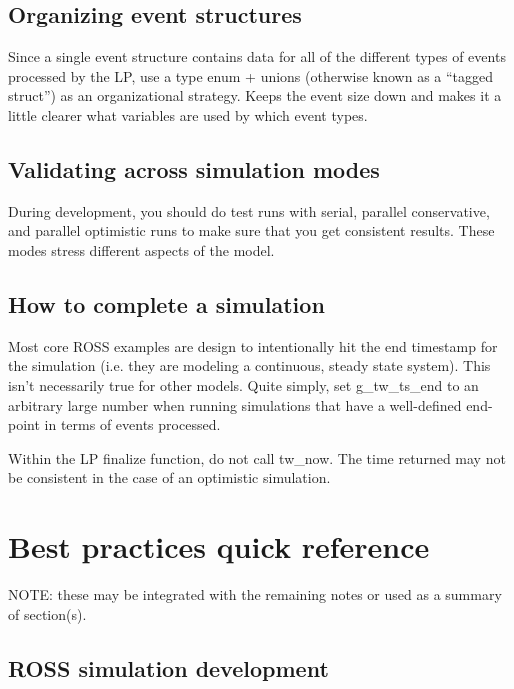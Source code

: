 \documentclass[conference,10pt,compsocconf,onecolumn]{IEEEtran}
\begin{document}
\subsection{Organizing event structures}

Since a single event structure contains data for all of the different types of
events processed by the LP, use a type enum + unions (otherwise known as a
``tagged struct'') as an organizational strategy. Keeps the event size down and
makes it a little clearer what variables are used by which event types.

\subsection{Validating across simulation modes}

During development, you should do test runs with serial, parallel conservative,
and parallel optimistic runs to make sure that you get consistent results.
These modes stress different aspects of the model.

\subsection{How to complete a simulation}

Most core ROSS examples are design to intentionally hit
the end timestamp for the simulation (i.e. they are modeling a continuous,
steady state system). This isn't necessarily true for other models. Quite
simply, set g\_tw\_ts\_end to an arbitrary large number when running simulations
that have a well-defined end-point in terms of events processed. 

Within the LP finalize function, do not call tw\_now. The time returned may not
be consistent in the case of an optimistic simulation.

\section{Best practices quick reference}

NOTE: these may be integrated with the remaining notes or used as a summary of
section(s).

\subsection{ROSS simulation development}
\end{document}
